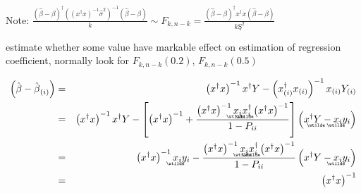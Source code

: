 \documentclass{article}
\begin{document}
\bigskip

Note: $\frac{\left( \hat{\beta}-\beta \right) ^{\dagger }\left( \left(
x^{\dagger }x\right) ^{-1}\hat{\sigma}^{2}\right) ^{-1}\left( \hat{\beta}%
-\beta \right) }{k}\sim F_{k,n-k}=\frac{\left( \hat{\beta}-\beta \right)
^{\dagger }x^{\dagger }x\left( \hat{\beta}-\beta \right) }{k\text{\c{S}}^{2}}
$

\bigskip

estimate whether some value have markable effect on estimation of regression
coefficient, normally look for $F_{k,n-k}(0.2)$, $F_{k,n-k}\left( 0.5\right) 
$

\bigskip

\begin{eqnarray*}
\left( \hat{\beta}-\hat{\beta}_{\left( i\right) }\right) &=&\left(
x^{\dagger }x\right) ^{-1}x^{\dagger }Y-\left( x_{\left( i\right) }^{\dagger
}x_{\left( i\right) }\right) ^{-1}x_{\left( i\right) }Y_{\left( i\right) } \\
&=&\left( x^{\dagger }x\right) ^{-1}x^{\dagger }Y-\left[ \left( x^{\dagger
}x\right) ^{-1}+\frac{\left( x^{\dagger }x\right) ^{-1}%
\underaccent{\wtilde}{x}%
_{i}%
\underaccent{\wtilde}{x}%
_{i}^{\dagger }\left( x^{\dagger }x\right) ^{-1}}{1-P_{ii}}\right] \left(
x^{\dagger }%
\underaccent{\wtilde}{Y}%
-%
\underaccent{\wtilde}{x}%
_{i}y_{i}\right) \\
&=&\left( x^{\dagger }x\right) ^{-1}%
\underaccent{\wtilde}{x}%
_{i}y_{i}-\frac{\left( x^{\dagger }x\right) ^{-1}%
\underaccent{\wtilde}{x}%
_{i}%
\underaccent{\wtilde}{x}%
_{i}^{\dagger }\left( x^{\dagger }x\right) ^{-1}}{1-P_{ii}}\left( x^{\dagger
}Y-%
\underaccent{\wtilde}{x}%
_{i}y_{i}\right) \\
&=&\left( x^{\dagger }x\right) ^{-1}%

\end{eqnarray*}
\end{document}
